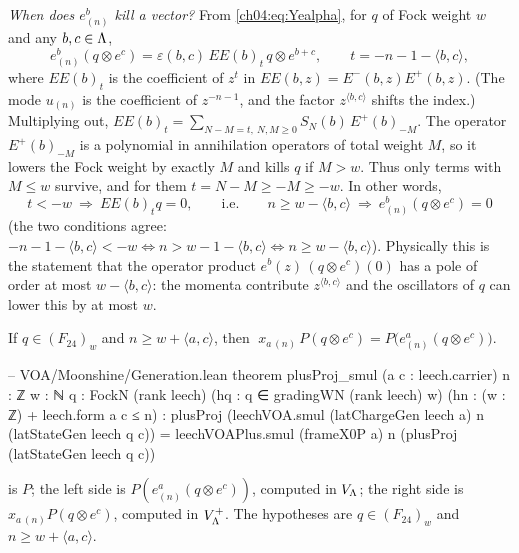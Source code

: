 \emph{When does $e^b_{(n)}$ kill a vector?} From \eqref{ch04:eq:Yealpha}, for $q$ of Fock weight $w$
and any $b,c\in{\Lambda}$,
\begin{equation}\label{ch04:eq:eamode}
  e^b_{(n)}(q\otimes e^c)=\varepsilon(b,c)\,EE(b)_{t}\,q\otimes e^{b+c},\qquad t=-n-1-\langle b,c\rangle,
\end{equation}
where $EE(b)_t$ is the coefficient of $z^t$ in $EE(b,z)=E^-(b,z)E^+(b,z)$. (The mode $u_{(n)}$ is the
coefficient of $z^{-n-1}$, and the factor $z^{\langle b,c\rangle}$ shifts the index.) Multiplying out,
$EE(b)_t=\sum_{N-M=t,\ N,M\ge0}S_N(b)\,E^+(b)_{-M}$. The operator $E^+(b)_{-M}$ is a polynomial in
annihilation operators of total weight $M$, so it lowers the Fock weight by exactly $M$ and kills
$q$ if $M>w$. Thus only terms with $M\le w$ survive, and for them $t=N-M\ge-M\ge-w$. In other words,
\begin{equation}\label{ch04:eq:kill}
  t<-w\ \Longrightarrow\ EE(b)_tq=0,\qquad\text{i.e.}\qquad
  n\ge w-\langle b,c\rangle\ \Longrightarrow\ e^b_{(n)}(q\otimes e^c)=0
\end{equation}
(the two conditions agree: $-n-1-\langle b,c\rangle<-w\iff n>w-1-\langle b,c\rangle\iff n\ge w-\langle b,c\rangle$).
Physically this is the statement that the operator product $e^b(z)\,(q\otimes e^c)(0)$ has a pole of
order at most $w-\langle b,c\rangle$: the momenta contribute $z^{\langle b,c\rangle}$ and the oscillators of $q$
can lower this by at most $w$.

\begin{lemma}\label{ch04:lem:safe}
If $q\in(F_{24})_w$ and $n\ge w+\langle a,c\rangle$, then
$\;x_{a\,(n)}\,P(q\otimes e^c)=P\big(e^a_{(n)}(q\otimes e^c)\big)$.
\end{lemma}

\begin{leancode}
-- VOA/Moonshine/Generation.lean
theorem plusProj_smul (a c : leech.carrier) {n : ℤ} {w : ℕ} {q : FockN (rank leech)}
    (hq : q ∈ gradingWN (rank leech) w) (hn : (w : ℤ) + leech.form a c ≤ n) :
    plusProj (leechVOA.smul (latChargeGen leech a) n (latStateGen leech q c))
      = leechVOAPlus.smul (frameX0P a) n (plusProj (latStateGen leech q c))
\end{leancode}

\begin{dictionary}
 is $P$; the left side is $P(e^a_{(n)}(q\otimes e^c))$, computed in $V_{\Lambda}$; the
right side is $x_{a\,(n)}P(q\otimes e^c)$, computed in $V_{\Lambda}^+$. The hypotheses are $q\in(F_{24})_w$
and $n\ge w+\langle a,c\rangle$.
\end{dictionary}

